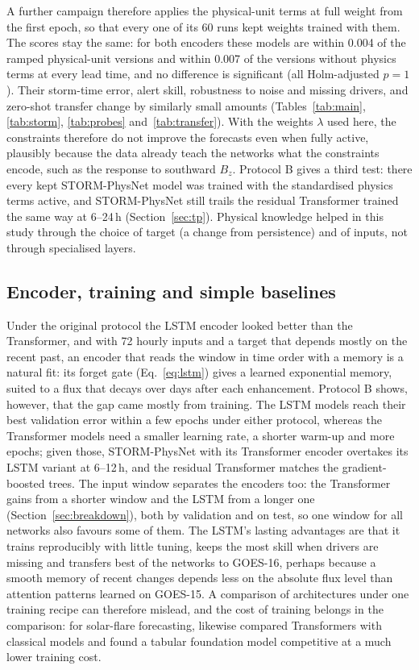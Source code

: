 \documentclass[a4paper,fleqn]{cas-dc}
\begin{document}
A further campaign therefore applies the physical-unit terms at full weight from the first epoch, so that every one
of its 60 runs kept weights trained with them. The scores stay the same: for both encoders these models are within
0.004 of the ramped physical-unit versions and within 0.007 of the versions without physics terms at every lead time,
and no difference is significant (all Holm-adjusted \(p=1\)). Their storm-time error, alert skill, robustness to
noise and missing drivers, and zero-shot transfer change by similarly small amounts (Tables~\ref{tab:main},
\ref{tab:storm}, \ref{tab:probes} and~\ref{tab:transfer}). With the weights \(\lambda\) used here, the
constraints therefore do not improve the forecasts even when fully active, plausibly because the data already
teach the networks what the constraints encode, such as the response to southward \(B_z\). Protocol B gives a
third test: there every kept STORM-PhysNet model was trained with the standardised physics terms active, and
STORM-PhysNet still trails the residual Transformer trained the same way at 6--24\,h (Section~\ref{sec:tp}). Physical knowledge helped in this study
through the choice of target (a change from persistence) and of inputs, not through specialised layers.

\subsection{Encoder, training and simple baselines}
Under the original protocol the LSTM encoder looked better than the Transformer, and with 72 hourly inputs and a
target that depends mostly on the recent past, an encoder that reads the window in time order with a memory is a
natural fit: its forget gate (Eq.~\ref{eq:lstm}) gives a learned exponential memory, suited to a flux that decays over
days after each enhancement. Protocol B shows, however, that the gap came mostly from training. The LSTM models reach
their best validation error within a few epochs under either protocol, whereas the Transformer models need a smaller
learning rate, a shorter warm-up and more epochs; given those, STORM-PhysNet with its Transformer encoder overtakes its
LSTM variant at 6--12\,h, and the residual Transformer matches the gradient-boosted trees. The input window
separates the encoders too: the Transformer gains from a shorter window and the LSTM from a longer one
(Section~\ref{sec:breakdown}), both by validation and on test, so one window for all networks also favours some of
them. The LSTM's lasting
advantages are that it trains reproducibly with little tuning, keeps the most skill when drivers are missing and
transfers best of the networks to GOES-16, perhaps because a smooth memory of recent changes depends less on the
absolute flux level than attention patterns learned on GOES-15. A comparison of architectures under one training
recipe can therefore mislead, and the cost of training belongs in the comparison: for solar-flare forecasting,
\citet{ferreira2026} likewise compared Transformers with classical models and found a tabular foundation model
competitive at a much lower training cost.
\end{document}
